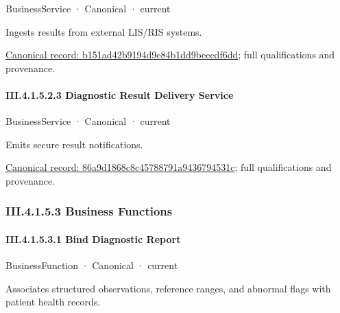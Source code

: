 \label{element:b151ad42b9194d9e84b1dd9beecdf6dd}
{\small BusinessService · Canonical · current}\par

Ingests results from external LIS/RIS systems.


{\footnotesize \href{../../../../../../../continuum/business/business-service/b151ad42b9194d9e84b1dd9beecdf6dd.md}{Canonical record: b151ad42b9194d9e84b1dd9beecdf6dd}; full qualifications and provenance.}\par
\paragraph*{III.4.1.5.2.3 Diagnostic Result Delivery Service}
\label{navigation:III.4.1.5.2.3}

\label{element:86a9d1868c8c45788791a9436794531c}
{\small BusinessService · Canonical · current}\par

Emits secure result notifications.


{\footnotesize \href{../../../../../../../continuum/business/business-service/86a9d1868c8c45788791a9436794531c.md}{Canonical record: 86a9d1868c8c45788791a9436794531c}; full qualifications and provenance.}\par
\subsubsection*{III.4.1.5.3 Business Functions}
\label{navigation:III.4.1.5.3}

\paragraph*{III.4.1.5.3.1 Bind Diagnostic Report}
\label{navigation:III.4.1.5.3.1}

\label{element:ee4bd6218f3a4029815bfc16912b88af}
{\small BusinessFunction · Canonical · current}\par

Associates structured observations, reference ranges, and abnormal flags with patient health records.


